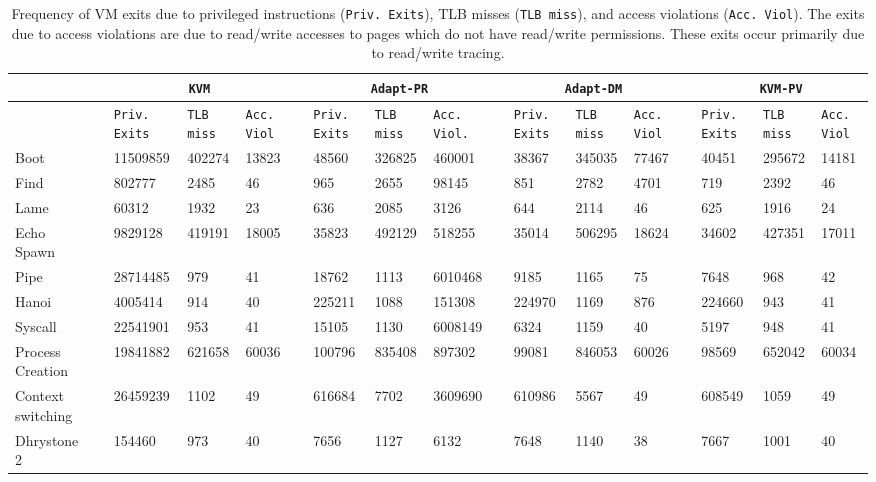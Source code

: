 \begin{center}
\begin{table*}
\centering
\begin{tabular}{
  |p{1.2cm}@{}|@{ }c@{ }|@{}p{1.3cm}|@{}p{1.0cm}|@{}p{1.0cm}@{}|@{ }c@{ }|@{}p{1.2cm}|@{}p{1.2cm}|@{}p{1.0cm}|@{ }c@{ }|@{}p{1.2cm}|@{}p{0.9cm}|@{}p{0.9cm}|@{ }c@{ }|@{}p{1.2cm}|@{}p{0.9cm}|@{}p{0.9cm}@{}|} \hline
	         &  & \multicolumn{3}{c|}{\tt KVM}& & \multicolumn{3}{c|}{\tt Adapt-PR} & & \multicolumn{3}{c|}{\tt Adapt-DM} & & \multicolumn{3}{c|}{\tt KVM-PV} \\ \hline

           &&{\tt Priv. Exits}&{\tt TLB miss}&{\tt Acc. Viol} &&{\tt Priv. Exits}&{\tt TLB miss}&{\tt Acc. Viol.}&&{\tt Priv. Exits}&{\tt TLB miss}&{\tt Acc. Viol}&&{\tt Priv. Exits}&{\tt TLB miss}&{\tt Acc. Viol} \\ \hline  
Boot	&&	11509859	&	402274	&	13823	&&	48560	&	326825	&	460001	&&	38367	&	345035	&	77467	&&	40451	&	295672	&	14181	\\	\hline
Find	&&	802777	&	2485	&	46	&&	965	&	2655	&	98145	&&	851	&	2782	&	4701	&&	719	&	2392	&	46	\\	\hline
Lame	&&	60312	&	1932	&	23	&&	636	&	2085	&	3126	&&	644	&	2114	&	46	&&	625	&	1916	&	24	\\	\hline
Echo Spawn	&&	9829128	&	419191	&	18005	&&	35823	&	492129	&	518255	&&	35014	&	506295	&	18624	&&	34602	&	427351	&	17011	\\	\hline
Pipe 	&&	28714485	&	979	&	41	&&	18762	&	1113	&	6010468	&&	9185	&	1165	&	75	&&	7648	&	968	&	42	\\	\hline
Hanoi	&&	4005414	&	914	&	40	&&	225211	&	1088	&	151308	&&	224970	&	1169	&	876	&&	224660	&	943	&	41	\\	\hline
Syscall	&&	22541901	&	953	&	41	&&	15105	&	1130	&	6008149	&&	6324	&	1159	&	40	&&	5197	&	948	&	41	\\	\hline
Process Creation	&&	19841882	&	621658	&	60036	&&	100796	&	835408	&	897302	&&	99081	&	846053	&	60026	&&	98569	&	652042	&	60034	\\	\hline
Context switching	&&	26459239	&	1102	&	49	&&	616684	&	7702	&	3609690	&&	610986	&	5567	&	49	&&	608549	&	1059	&	49	\\	\hline
Dhrystone 2	&&	154460	&	973	&	40	&&	7656	&	1127	&	6132	&&	7648	&	1140	&	38	&&	7667	&	1001	&	40	\\	\hline
      \end{tabular}
\caption{\label{tab:vm_exit_stats}Frequency of VM exits due to privileged instructions ({\tt Priv. Exits}), TLB misses ({\tt TLB miss}), and access violations ({\tt Acc. Viol}). The
exits due to access violations are due to read/write accesses to pages which do not have read/write permissions. These exits occur primarily due to read/write tracing.}
\end{table*} 
\end{center}

